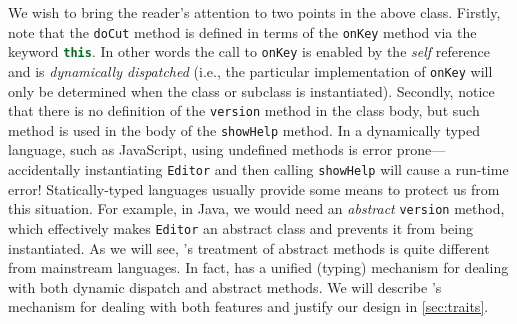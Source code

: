 We wish to bring the reader's attention to two points in the above class.
Firstly, note that the \lstinline{doCut} method is defined in terms of the
\lstinline{onKey} method via the keyword
\lstinline[language=JavaScript]{this}. In other words the call to
\lstinline{onKey} is enabled by the \emph{self} reference and is
\emph{dynamically dispatched} (i.e., the particular implementation of
\lstinline{onKey} will only be determined when the class or subclass
is instantiated). %
Secondly, notice that there is no definition of
the \lstinline{version} method in the class body, but such method is used in the body of the
\lstinline{showHelp} method. In a dynamically typed language, such as JavaScript, using
undefined methods is error prone---accidentally instantiating \lstinline{Editor}
and then calling \lstinline{showHelp} will cause a run-time error!
Statically-typed languages usually provide some means to protect us from this
situation. For example, in Java, we would need an \emph{abstract} \lstinline{version}
method, which effectively makes \lstinline{Editor} an abstract class and
prevents it from being instantiated. As we will see, \sedel's treatment of
abstract methods is quite different from mainstream languages. In fact, \sedel
has a unified (typing) mechanism for dealing with both dynamic dispatch and abstract
methods. We will describe \sedel's mechanism for dealing with both features and
justify our design in \cref{sec:traits}.


